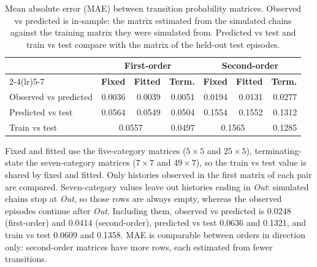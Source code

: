 \begin{table}[htbp]
\centering
\small
\caption{Mean absolute error (MAE) between transition probability matrices. Observed vs predicted is in-sample: the matrix estimated from the simulated chains against the training matrix they were simulated from. Predicted vs test and train vs test compare with the matrix of the held-out test episodes.}
\label{tab:matrix_mae}
\setlength{\tabcolsep}{4pt}
\begin{tabular*}{\linewidth}{@{\extracolsep{\fill}}lrrrrrr}
\toprule
 & \multicolumn{3}{c}{\textbf{First-order}} & \multicolumn{3}{c}{\textbf{Second-order}} \\
\cmidrule(lr){2-4}\cmidrule(lr){5-7}
 & \textbf{Fixed} & \textbf{Fitted} & \textbf{Term.} & \textbf{Fixed} & \textbf{Fitted} & \textbf{Term.} \\
\midrule
Observed vs predicted & 0.0036 & 0.0039 & 0.0051 & 0.0194 & 0.0131 & 0.0277 \\
Predicted vs test & 0.0564 & 0.0549 & 0.0504 & 0.1554 & 0.1552 & 0.1312 \\
Train vs test & \multicolumn{2}{c}{0.0557} & 0.0497 & \multicolumn{2}{c}{0.1565} & 0.1285 \\
\bottomrule
\end{tabular*}
\par\smallskip
\begin{minipage}{\linewidth}\footnotesize
Fixed and fitted use the five-category matrices ($5\times5$ and $25\times5$), terminating-state the seven-category matrices ($7\times7$ and $49\times7$), so the train vs test value is shared by fixed and fitted. Only histories observed in the first matrix of each pair are compared. Seven-category values leave out histories ending in \textit{Out}: simulated chains stop at \textit{Out}, so those rows are always empty, whereas the observed episodes continue after \textit{Out}. Including them, observed vs predicted is 0.0248 (first-order) and 0.0414 (second-order), predicted vs test 0.0636 and 0.1321, and train vs test 0.0609 and 0.1358. MAE is comparable between orders in direction only: second-order matrices have more rows, each estimated from fewer transitions.
\end{minipage}
\end{table}
